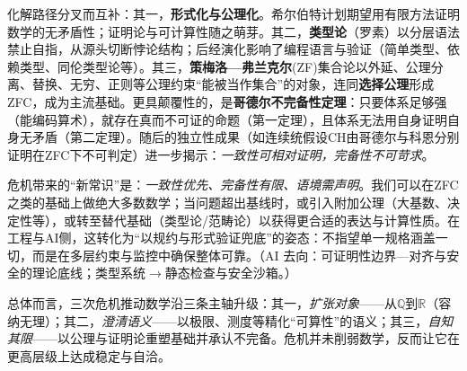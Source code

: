 化解路径分叉而互补：其一，{\bf 形式化与公理化}。希尔伯特计划期望用有限方法证明数学的无矛盾性；证明论与可计算性随之萌芽。其二，{\bf 类型论}（罗素）以分层语法禁止自指，从源头切断悖论结构；后经演化影响了编程语言与验证（简单类型、依赖类型、同伦类型论等）。其三，{\bf 策梅洛—弗兰克尔}(ZF)集合论以外延、公理分离、替换、无穷、正则等公理约束“能被当作集合”的对象，连同{\bf 选择公理}形成ZFC，成为主流基础。更具颠覆性的，是{\bf 哥德尔不完备性定理}：只要体系足够强（能编码算术），就存在真而不可证的命题（第一定理），且体系无法用自身证明自身无矛盾（第二定理）。随后的独立性成果（如连续统假设CH由哥德尔与科恩分别证明在ZFC下不可判定）进一步揭示：{\itshape 一致性可相对证明，完备性不可苛求}。

危机带来的“新常识”是：{\itshape 一致性优先、完备性有限、语境需声明}。我们可以在ZFC之类的基础上做绝大多数数学；当问题超出基线时，或引入附加公理（大基数、决定性等），或转至替代基础（类型论/范畴论）以获得更合适的表达与计算性质。在工程与AI侧，这转化为“以规约与形式验证兜底”的姿态：不指望单一规格涵盖一切，而是在多层约束与监控中确保整体可靠。{（AI 去向：可证明性边界—对齐与安全的理论底线；类型系统$\rightarrow$静态检查与安全沙箱。）}

总体而言，三次危机推动数学沿三条主轴升级：其一，{\itshape 扩张对象}——从$\mathbb{Q}$到$\mathbb{R}$（容纳无理）；其二，{\itshape 澄清语义}——以极限、测度等精化“可算性”的语义；其三，{\itshape 自知其限}——以公理与证明论重塑基础并承认不完备。危机并未削弱数学，反而让它在更高层级上达成稳定与自洽。
